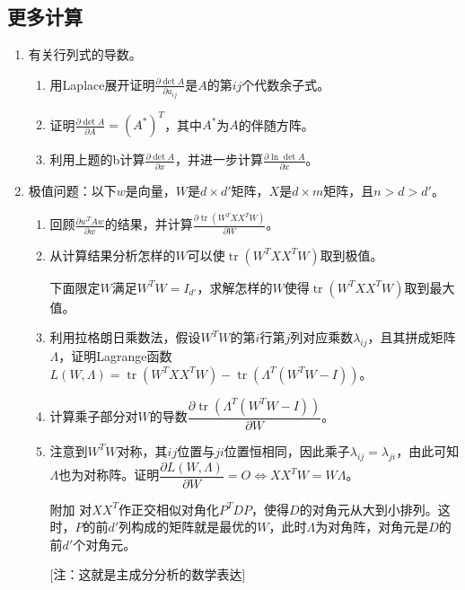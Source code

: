\documentclass[a4paper,UTF8,fontset=windows]{ctexart}
\DeclareMathOperator*{\tr}{tr}
\begin{document}
\subsection{更多计算}
\begin{enumerate}
    \item 有关行列式的导数。
    \begin{enumerate}
        \item 用Laplace展开证明$\frac{\partial\det A}{\partial a_{ij}}$是$A$的第$ij$个代数余子式。
        \item 证明$\frac{\partial\det A}{\partial A}=(A^*)^T$，其中$A^*$为$A$的伴随方阵。
        \item 利用上题的b计算$\frac{\partial\det A}{\partial x}$，并进一步计算$\frac{\partial\ln\det A}{\partial x}$。
    \end{enumerate}
    \item 极值问题：以下$w$是向量，$W$是$d\times d'$矩阵，$X$是$d\times m$矩阵，且$n>d>d'$。
    \begin{enumerate}
        \item 回顾$\frac{\partial w^TAw}{\partial w}$的结果，并计算$\frac{\partial\tr(W^TXX^TW)}{\partial W}$。
        \item 从计算结果分析怎样的$W$可以使$\tr(W^TXX^TW)$取到极值。
        
        下面限定$W$满足$W^TW=I_{d'}$，求解怎样的$W$使得$\tr(W^TXX^TW)$取到最大值。
        \item 利用拉格朗日乘数法，假设$W^TW$的第$i$行第$j$列对应乘数$\lambda_{ij}$，且其拼成矩阵$\Lambda$，证明Lagrange函数$L(W,\Lambda)=\tr(W^TXX^TW)-\tr(\Lambda^T(W^TW-I))$。
        \item 计算乘子部分对$W$的导数$\dfrac{\partial \tr(\Lambda^T(W^TW-I))}{\partial W}$。
        \item 注意到$W^TW$对称，其$ij$位置与$ji$位置恒相同，因此乘子$\lambda_{ij}=\lambda_{ji}$，由此可知$\Lambda$也为对称阵。证明$\dfrac{\partial L(W,\Lambda)}{\partial W}=O\Leftrightarrow XX^TW=W\Lambda$。
        
        \item [附加]对$XX^T$作正交相似对角化$P^TDP$，使得$D$的对角元从大到小排列。这时，$P$的前$d'$列构成的矩阵就是最优的$W$，此时$\Lambda$为对角阵，对角元是$D$的前$d'$个对角元。
        
        [注：这就是主成分分析的数学表达]
    \end{enumerate}
\end{enumerate}
\end{document}

